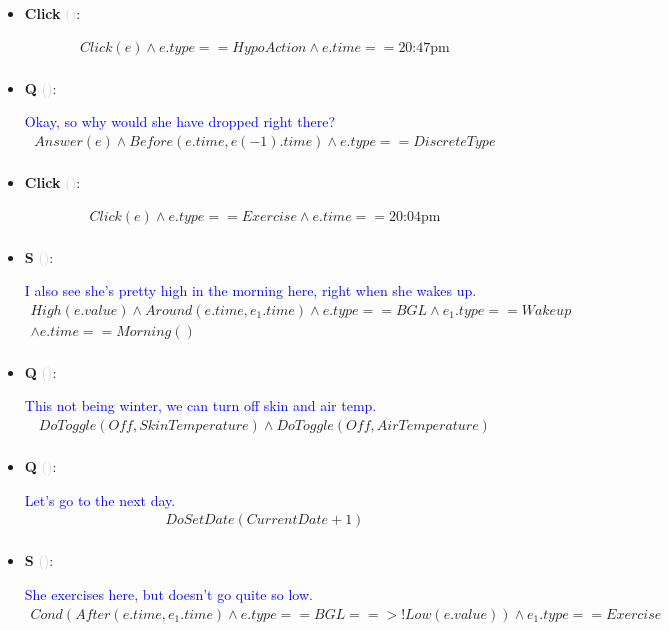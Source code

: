 \documentclass[11pt]{article}
\newcounter{CQ}
\newcounter{CS}
\newcounter{CClick}
\newcommand{\key}[1]{\textcolor{lightgray}{#1}}
\begin{document}
\begin{itemize}
	\item
	\textbf{Click\theCClick} \key{()}: \addtocounter{CClick}{1}
	\begin{multline*}
	Click(e) \wedge e.type == HypoAction \wedge e.time == \mbox{20:47pm} \\
	\end{multline*}
	
	\item
	\textbf{Q\theCQ} \key{()}: \addtocounter{CQ}{1}
	\textcolor{blue}{ Okay, so why would she have dropped right there? }
	\begin{multline*}
	Answer(e) \wedge Before(e.time, e(-1).time) \wedge e.type == DiscreteType \\
	\end{multline*}
	
	\item
	\textbf{Click\theCClick} \key{()}: \addtocounter{CClick}{1}
	\begin{multline*}
	Click(e) \wedge e.type == Exercise \wedge e.time == \mbox{20:04pm} \\
	\end{multline*}
	
	
	\item
	\textbf{S\theCS} \key{()}: \addtocounter{CS}{1}
	\textcolor{blue}{ I also see she's pretty high in the morning here, right when she wakes up. }
	\begin{multline*}
	High(e.value) \wedge Around(e.time, e_1.time) \wedge e.type==BGL	\wedge e_1.type == Wakeup \\
	\wedge e.time==Morning()\\
	\end{multline*}
	

	\item
	\textbf{Q\theCQ} \key{()}: \addtocounter{CQ}{1}
	\textcolor{blue}{ This not being winter, we can turn off skin and air temp. }
	\begin{multline*}
	DoToggle(Off, SkinTemperature) \wedge DoToggle(Off, AirTemperature)  \\
	\end{multline*}
	
	\item
	\textbf{Q\theCQ} \key{()}: \addtocounter{CQ}{1}
	\textcolor{blue}{ Let's go to the next day. }
	\begin{multline*}
	DoSetDate(CurrentDate + 1) \\
	\end{multline*}
	
	\item
	\textbf{S\theCS} \key{()}: \addtocounter{CS}{1}
	\textcolor{blue}{ She exercises here, but doesn't go quite so low. }
	\begin{multline*}
	Cond( After(e.time, e_1.time) \wedge e.type==BGL ==> !Low(e.value)) \wedge e_1.type == Exercise \\
	\end{multline*}
	

\end{itemize}
\end{document}
